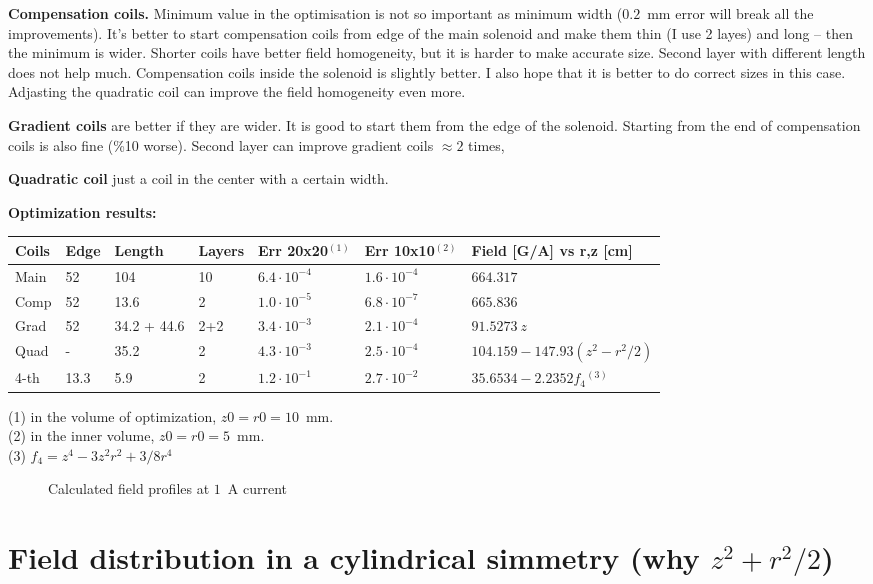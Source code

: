 \documentclass[a4paper]{article}
\newcommand{\image}[3]{
\begin{figure}[#1]
\begin{center}

\caption{\small#3}
\label{image:#2}
\end{center}
\end{figure}
}
\begin{document}
{\bf Compensation coils.} Minimum value in the optimisation is not so
important as minimum width ($0.2$~mm error will break all the
improvements). It's better to start compensation coils from edge of the
main solenoid and make them thin (I use 2 layes) and long -- then the
minimum is wider. Shorter coils have better field homogeneity, but it is
harder to make accurate size. Second layer with different length does not
help much. Compensation coils inside the solenoid is slightly better. I
also hope that it is better to do correct sizes in this case. Adjasting
the quadratic coil can improve the field homogeneity even more.

{\bf Gradient coils} are better if they are wider. It is good to start them
from the edge of the solenoid. Starting from the end of compensation coils
is also fine (\%10 worse). Second layer can improve gradient coils $\approx 2$ times,

{\bf Quadratic coil} just a coil in the center with a certain width.

{\bf Optimization results:}\\
\medskip
\begin{tabular}{lllllll}
Coils & Edge &Length       & Layers & Err 20x20$^{(1)}$  & Err 10x10$^{(2)}$        & Field [G/A] vs r,z [cm] \\\hline
Main  & 52   & 104         & 10     & $6.4\cdot10^{-4}$ & $1.6\cdot10^{-4}$ & $664.317$\\
Comp  & 52   & 13.6        & 2      & $1.0\cdot10^{-5}$ & $6.8\cdot10^{-7}$ & $665.836$\\
Grad  & 52   & 34.2 + 44.6 & 2+2    & $3.4\cdot10^{-3}$ & $2.1\cdot10^{-4}$ & $91.5273\ z$\\
Quad  & -    & 35.2        & 2      & $4.3\cdot10^{-3}$ & $2.5\cdot10^{-4}$ & $104.159 - 147.93 (z^2-r^2/2)$\\
4-th  & 13.3 & 5.9         & 2      & $1.2\cdot10^{-1}$ & $2.7\cdot10^{-2}$ & $35.6534 - 2.2352 f_4$$^{(3)}$\\
\end{tabular}
\medskip

\noindent
(1) in the volume of optimization, $z0=r0=10$~mm.\\
(2) in the inner volume, $z0=r0=5$~mm.\\
(3) $f_4 = z^4 - 3 z^2 r^2 + 3/8 r^4$


\image{h}{fits}{Calculated field profiles at $1$~A current}

\section*{Field distribution in a cylindrical simmetry (why $z^2+r^2/2$)}
\end{document}
